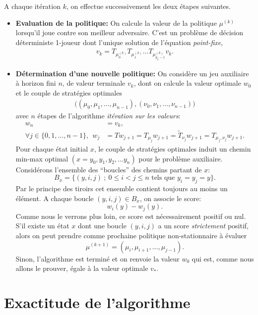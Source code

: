 \documentclass{article}
\begin{document}
A chaque itération $k$, on effectue successivement les deux étapes suivantes.
\begin{itemize}
\item {\bf Evaluation de la politique:} On calcule la valeur de la politique $\mu^{(k)}$ lorsqu'il joue contre son meilleur adversaire. C'est un problème de décision déterministe 1-joueur dont l'unique solution de l'équation \emph{point-fixe},
\begin{align}
v_k = T_{\mu^{(k)}_0} T_{\mu^{(k)}_1} \dots T_{\mu^{(k)}_{p_k-1}} v_k.
\end{align}
\item {\bf Détermination d'une nouvelle politique:} On considère un jeu auxiliaire à horizon fini $n$, de valeur terminale $v_k$, dont on calcule la valeur optimale $w_0$ et le couple de stratégies optimales
  \begin{align}
    \big( (\mu_0,\mu_1,\dots,\mu_{n-1}),(\nu_0,\nu_1,\dots,\nu_{n-1}) \big)
  \end{align}
  avec $n$ étapes de l'algorithme \emph{itération sur les valeurs}:
\begin{align}
  w_n & = v_k,\\
\forall j \in \{0,1,\dots,n-1\},~~  w_j & = T w_{j+1} = T_{\mu_j} w_{j+1} = \tilde T_{\nu_j} w_{j+1} = T_{\mu_{j},\nu_{j}} w_{j+1}.
\end{align}
Pour chaque état initial $x$, le couple de stratégies optimales induit un chemin min-max optimal $(x=y_0, y_1, y_2, \dots y_n)$ pour le problème auxiliaire. Considérons l'ensemble des ``boucles'' des chemins partant de $x$:
$$
B_x = \{ (y, i,j)~;~ 0\le i<j \le n \mbox{ tels que }y_i=y_j=y \}.
$$
Par le principe des tiroirs cet ensemble contient toujours au moins un élément.
A chaque boucle $(y, i,j) \in B_x$, on associe le score:
$$
w_i(y)-w_j(y).
$$
Comme nous le verrons plus loin, ce score est nécessairement positif ou nul.
S'il existe un état $x$ dont une boucle $(y, i,j)$ a un score \emph{strictement} positif, alors on peut prendre comme prochaine politique non-stationnaire à évaluer
$$
\mu^{(k+1)} = (\mu_i,\mu_{i+1},\dots,\mu_{j-1}).
$$
Sinon, l'algorithme est terminé et on renvoie la valeur $w_0$ qui est, comme nous allons le prouver, égale à la valeur optimale $v_*$.
\end{itemize}


\section{Exactitude de l'algorithme}
\end{document}
